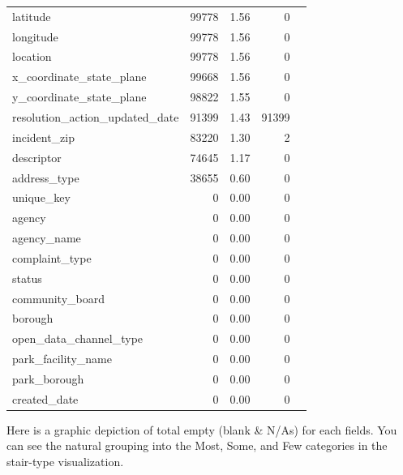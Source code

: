 \documentclass[12pt, titlepage]{article}
\begin{document}
\begin{table}[tbp]
{\begin{tabular}{lrrrl}
		latitude & 99778 & 1.56 & 0 \\
		longitude & 99778 & 1.56 & 0 \\
		location & 99778 & 1.56 & 0 \\
		x\_coordinate\_state\_plane & 99668 & 1.56 & 0 \\
		y\_coordinate\_state\_plane & 98822 & 1.55 & 0 \\
		resolution\_action\_updated\_date & 91399 & 1.43 & 91399 \\
		incident\_zip & 83220 & 1.30 & 2 \\
		descriptor & 74645 & 1.17 & 0 \\
		address\_type & 38655 & 0.60 & 0 \\
		unique\_key & 0 & 0.00 & 0 \\
		agency & 0 & 0.00 & 0 \\
		agency\_name & 0 & 0.00 & 0 \\
		complaint\_type & 0 & 0.00 & 0 \\
		status & 0 & 0.00 & 0 \\
		community\_board & 0 & 0.00 & 0 \\
		borough & 0 & 0.00 & 0 \\
		open\_data\_channel\_type & 0 & 0.00 & 0 \\
		park\_facility\_name & 0 & 0.00 & 0 \\
		park\_borough & 0 & 0.00 & 0 \\
		created\_date & 0 & 0.00 & 0 \\
	\bottomrule
\end{tabular}
}
\end{table}


Here is a graphic depiction of total empty (blank \& N/As) for each fields. 
You can see the natural grouping into the Most, Some, and Few categories 
in the stair-type visualization. 
\end{document}
